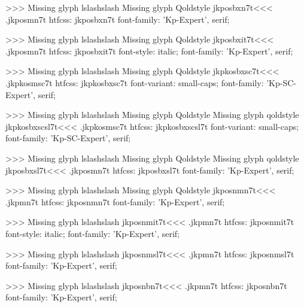 >>>
Missing glyph	lslashslash
Missing glyph	Qoldstyle
\<jkposbxn7t\><<<
.jkposmn7t
htfcss:  jkposbxn7t  font-family: 'Kp-Expert', serif;

>>>
Missing glyph	lslashslash
Missing glyph	Qoldstyle
\<jkposbxit7t\><<<
.jkposmn7t
htfcss:  jkposbxit7t  font-style: italic; font-family: 'Kp-Expert', serif;

>>>
Missing glyph	lslashslash
Missing glyph	Qoldstyle
\<jkpkosbxsc7t\><<<
.jkpkosmsc7t
htfcss:  jkpkosbxsc7t  font-variant: small-caps; font-family: 'Kp-SC-Expert', serif;

>>>
Missing glyph	lslashslash
Missing glyph	Qoldstyle
Missing glyph	qoldstyle
\<jkpkosbxscsl7t\><<<
.jkpkosmsc7t
htfcss:  jkpkosbxscsl7t  font-variant: small-caps; font-family: 'Kp-SC-Expert', serif;

>>>
Missing glyph	lslashslash
Missing glyph	Qoldstyle
Missing glyph	qoldstyle
\<jkposbxsl7t\><<<
.jkposmn7t
htfcss:  jkposbxsl7t  font-family: 'Kp-Expert', serif;

>>>
Missing glyph	lslashslash
Missing glyph	Qoldstyle
\<jkposnmn7t\><<<
.jkpmn7t
htfcss:  jkposnmn7t  font-family: 'Kp-Expert', serif;

>>>
Missing glyph	lslashslash
\<jkposnmit7t\><<<
.jkpmn7t
htfcss:  jkposnmit7t  font-style: italic; font-family: 'Kp-Expert', serif;

>>>
Missing glyph	lslashslash
\<jkposnmsl7t\><<<
.jkpmn7t
htfcss:  jkposnmsl7t  font-family: 'Kp-Expert', serif;

>>>
Missing glyph	lslashslash
\<jkposnbn7t\><<<
.jkpmn7t
htfcss:  jkposnbn7t  font-family: 'Kp-Expert', serif;

